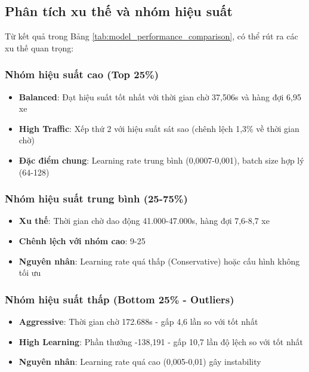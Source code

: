 \subsection{Phân tích xu thế và nhóm hiệu suất}

Từ kết quả trong Bảng \ref{tab:model_performance_comparison}, có thể rút ra các xu thế quan trọng:

\subsubsection{Nhóm hiệu suất cao (Top 25\%)}
\begin{itemize}
    \item \textbf{Balanced}: Đạt hiệu suất tốt nhất với thời gian chờ 37,506s và hàng đợi 6,95 xe
    \item \textbf{High Traffic}: Xếp thứ 2 với hiệu suất sát sao (chênh lệch 1,3\% về thời gian chờ)
    \item \textbf{Đặc điểm chung}: Learning rate trung bình (0,0007-0,001), batch size hợp lý (64-128)
\end{itemize}

\subsubsection{Nhóm hiệu suất trung bình (25-75\%)}
\begin{itemize}
    \item \textbf{Xu thế}: Thời gian chờ dao động 41.000-47.000s, hàng đợi 7,6-8,7 xe
    \item \textbf{Chênh lệch với nhóm cao}: 9-25%
    \item \textbf{Nguyên nhân}: Learning rate quá thấp (Conservative) hoặc cấu hình không tối ưu
\end{itemize}

\subsubsection{Nhóm hiệu suất thấp (Bottom 25\% - Outliers)}
\begin{itemize}
    \item \textbf{Aggressive}: Thời gian chờ 172.688s - gấp 4,6 lần so với tốt nhất
    \item \textbf{High Learning}: Phần thưởng -138,191 - gấp 10,7 lần độ lệch so với tốt nhất
    \item \textbf{Nguyên nhân}: Learning rate quá cao (0,005-0,01) gây instability
\end{itemize}

